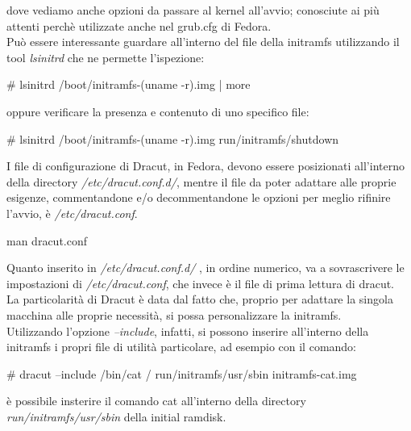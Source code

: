 dove vediamo anche opzioni da passare al kernel all'avvio; conosciute ai più attenti perchè utilizzate anche nel grub.cfg di Fedora.\\

Può essere interessante guardare all'interno del file della initramfs utilizzando il tool {\itshape lsinitrd}
che ne permette l'ispezione:

\begin{shaded}
{\color[cmyk]{0, 0, 0, 0}\# lsinitrd /boot/initramfs-\textdollar(uname -r).img | more}
\end{shaded}

oppure verificare la presenza e contenuto di uno specifico file:

\begin{shaded}
{\color[cmyk]{0, 0, 0, 0}\# lsinitrd /boot/initramfs-\textdollar(uname -r).img run/initramfs/shutdown}
\end{shaded}

I file di configurazione di Dracut, in Fedora, devono essere posizionati all'interno della directory {\itshape /etc/dracut.conf.d/}, mentre il file da poter adattare alle proprie esigenze, commentandone e/o decommentandone le opzioni per meglio rifinire l'avvio, è {\itshape /etc/dracut.conf}.

\begin{shaded}
{\color[cmyk]{0, 0, 0, 0}\textdollar man dracut.conf}
\end{shaded}

Quanto inserito in {\itshape /etc/dracut.conf.d/} , in ordine numerico, va a sovrascrivere le impostazioni di {\itshape /etc/dracut.conf}, che invece è il file di prima lettura di dracut.\\

La particolarità di Dracut è data dal fatto che, proprio per adattare la singola macchina alle proprie necessità, si possa personalizzare la initramfs.\\

Utilizzando l'opzione {\itshape--include}, infatti, si possono inserire all'interno della initramfs i propri file di utilità particolare, ad esempio con il comando:

\begin{shaded}
{\color[cmyk]{0, 0, 0, 0}\# dracut --include /bin/cat / run/initramfs/usr/sbin initramfs-cat.img}
\end{shaded}
è possibile insterire il comando cat all'interno della directory {\itshape run/initramfs/usr/sbin} della initial ramdisk.\\

